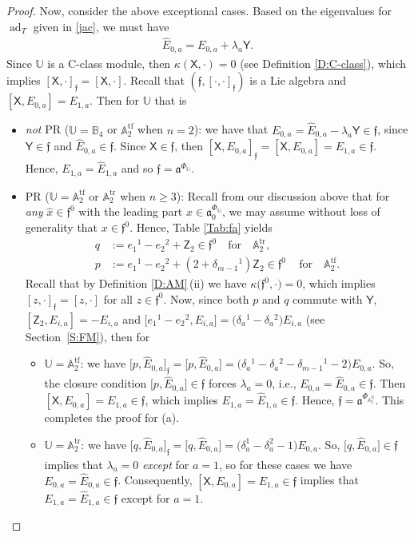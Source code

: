 \documentclass[10pt,a4paper]{amsart}
\DeclareMathOperator{\tf}{tf}
\DeclareMathOperator{\tr}{tr}
\newcommand\ad{\operatorname{ad}}
\newcommand\fa{\mathfrak{a}}
\newcommand\ff{\mathfrak{f}}
\newcommand\bbU{\mathbb{U}}
\newcommand\bbA{\mathbb{A}}
\newcommand\bbB{\mathbb{B}}
\newcommand\sfX{\mathsf{X}}
\newcommand\sfY{\mathsf{Y}}
\newcommand\sfZ{\mathsf{Z}}
\numberwithin{equation}{section}
\begin{document}
\begin{proof}
 Now, consider the above exceptional cases. Based on the eigenvalues for $\ad_T$ given in \eqref{jac}, we must have
 \begin{align*}
 \widehat{E}_{0,a} = E_{0,a} + \lambda_a\sfY.
 \end{align*}
 Since $\bbU$ is a C-class module, then $\kappa(\sfX, \cdot) = 0$ (see Definition \ref{D:C-class}), which implies $[\sfX, \cdot]_\ff = [\sfX, \cdot]$. Recall that $(\ff, [\cdot, \cdot]_\ff)$ is a Lie algebra and $[\sfX, E_{0,a}] = E_{1,a}$. Then for $\bbU$ that is
\begin{itemize}\itemsep=0pt
\item[(a)] {\em not} PR \big($\bbU = \bbB_4$ or $\bbA_2^{\tf}$ when $n=2$\big): we have that $E_{0,a} = \widehat{E}_{0,a}- \lambda_a\sfY \in \ff$, since $\sfY \in \ff$ and $\widehat{E}_{0,a} \in \ff$. Since $\sfX \in \ff$, then $[\sfX, E_{0,a}]_\ff = [\sfX, E_{0,a}] = E_{1,a} \in \ff$. Hence, $E_{1,a} = \widehat{E}_{1,a}$ and so $\ff = \fa^{\Phi_{\bbU}}$.
\item [(b)] PR \big($\bbU =\bbA_2^{\tf}$ or $\bbA_2^{\tr}$ when $n\ge 3$\big): Recall from our discussion above that for {\em any} $\widehat{x} \in \ff^0$ with the leading part $x \in \fa^{\Phi_\bbU}_0$, we may assume without loss of generality that $x \in \ff^0$. Hence, Table \ref{Tab:fa} yields
 \begin{align*} %
 q &:= e_1{}^1 - e_2{}^2 + \sfZ_2 \in \ff^0 \quad \text{for} \quad \bbA_2^{\tr},\\
 p &:= e_1{}^1 - e_2{}^2 + (2 + \delta_{m-1}{}^1)\sfZ_2 \in \ff^0\, \quad \text{for} \quad \bbA_2^{\tf}.
 \end{align*}
Recall that by Definition \ref{D:AM}\,(ii) we have $\kappa\bigl(\ff^0,\cdot\bigr) = 0$, which implies $[z, \cdot]_\ff = [z,\cdot]$ for all $z \in \ff^0$. Now, since both $p$ and $q$ commute with $\sfY$, $[\sfZ_2, E_{i,a}] = -E_{i,a}$ and $\big[e_1{}^1 - e_2{}^2, E_{i,a}\big] = \bigl(\delta_a{}^1-\delta_a{}^2\bigr) E_{i,a}$ (see Section~\ref{S:FM}), then for
\begin{itemize}\itemsep=0pt
\item[(i)] $\bbU = \bbA_2^{\tf}$: we have $\big[p,\widehat{E}_{0,a}\big]_\ff = \big[p,\widehat{E}_{0,a}\big] = \bigl(\delta_a{}^1-\delta_a{}^2 - \delta_{m-1}{}^1-2\bigr)E_{0,a}$. So, the closure condition $\big[p,\widehat{E}_{0,a}\big] \in \ff$ forces $\lambda_a = 0$, i.e., $E_{0,a} = \widehat{E}_{0,a} \in \ff$. Then $[\sfX, E_{0,a} ]= E_{1,a} \in \ff$, which implies $E_{1,a} =\widehat{E}_{1,a} \in \ff$. Hence, $\ff = \fa^{\Phi_{\bbA_2^{\tf}}}$. This completes the proof for (a).
\item [(ii)] $\bbU = \bbA_2^{\tr}$: we have $\big[q, \widehat{E}_{0,a}\big]_\ff = \big[q, \widehat{E}_{0,a}\big] = \bigl(\delta^1_a - \delta^2_a - 1\bigr) E_{0,a}$. So, $\big[q, \widehat{E}_{0,a}\big] \in \ff$ implies that $\lambda_a = 0$ {\em except} for $a=1$, so for these cases we have $E_{0,a} = \widehat{E}_{0,a} \in \ff$. Consequently, $[\sfX, E_{0,a}] = E_{1,a} \in \ff$ implies that $E_{1,a} = \widehat{E}_{1,a} \in \ff$ except for $a=1$.


\end{itemize}
\end{itemize}
\end{proof}
\end{document}
